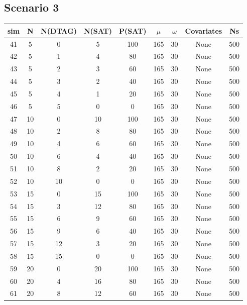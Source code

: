 \documentclass[
]{article}
\begin{document}
\subsection{Scenario 3}

\begin{table}[H]
\centering
\begin{tabular}{ccccccccc}
\toprule
\textbf{sim} & \textbf{N} & \textbf{N(DTAG)} & \textbf{N(SAT)} & \textbf{P(SAT)} & \textbf{$\mu$} & \textbf{$\omega$} & \textbf{Covariates} & \textbf{Ns}\\
\midrule
\rowcolor{gray!6}  41 & 5 & 0 & 5 & 100 & 165 & 30 & None & 500\\
42 & 5 & 1 & 4 & 80 & 165 & 30 & None & 500\\
\rowcolor{gray!6}  43 & 5 & 2 & 3 & 60 & 165 & 30 & None & 500\\
44 & 5 & 3 & 2 & 40 & 165 & 30 & None & 500\\
\rowcolor{gray!6}  45 & 5 & 4 & 1 & 20 & 165 & 30 & None & 500\\
46 & 5 & 5 & 0 & 0 & 165 & 30 & None & 500\\
\rowcolor{gray!6}  47 & 10 & 0 & 10 & 100 & 165 & 30 & None & 500\\
48 & 10 & 2 & 8 & 80 & 165 & 30 & None & 500\\
\rowcolor{gray!6}  49 & 10 & 4 & 6 & 60 & 165 & 30 & None & 500\\
50 & 10 & 6 & 4 & 40 & 165 & 30 & None & 500\\
\rowcolor{gray!6}  51 & 10 & 8 & 2 & 20 & 165 & 30 & None & 500\\
52 & 10 & 10 & 0 & 0 & 165 & 30 & None & 500\\
\rowcolor{gray!6}  53 & 15 & 0 & 15 & 100 & 165 & 30 & None & 500\\
54 & 15 & 3 & 12 & 80 & 165 & 30 & None & 500\\
\rowcolor{gray!6}  55 & 15 & 6 & 9 & 60 & 165 & 30 & None & 500\\
56 & 15 & 9 & 6 & 40 & 165 & 30 & None & 500\\
\rowcolor{gray!6}  57 & 15 & 12 & 3 & 20 & 165 & 30 & None & 500\\
58 & 15 & 15 & 0 & 0 & 165 & 30 & None & 500\\
\rowcolor{gray!6}  59 & 20 & 0 & 20 & 100 & 165 & 30 & None & 500\\
60 & 20 & 4 & 16 & 80 & 165 & 30 & None & 500\\
\rowcolor{gray!6}  61 & 20 & 8 & 12 & 60 & 165 & 30 & None & 500\\

\end{tabular}
\end{table}
\end{document}
